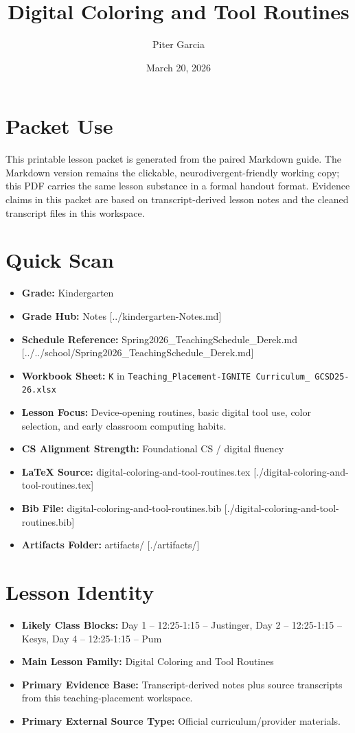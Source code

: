 \documentclass[11pt]{article}
\title{Digital Coloring and Tool Routines}
\author{Piter Garcia}
\date{March 20, 2026}
\begin{document}
\maketitle
\section*{Packet Use}
This printable lesson packet is generated from the paired Markdown guide. The Markdown version remains the clickable, neurodivergent-friendly working copy; this PDF carries the same lesson substance in a formal handout format. Evidence claims in this packet are based on transcript-derived lesson notes and the cleaned transcript files in this workspace.

\section*{Quick Scan}
\begin{itemize}[leftmargin=*]
\item \textbf{Grade:} Kindergarten
\item \textbf{Grade Hub:} Notes [../kindergarten-Notes.md]
\item \textbf{Schedule Reference:} Spring2026\_TeachingSchedule\_Derek.md [../../school/Spring2026\_TeachingSchedule\_Derek.md]
\item \textbf{Workbook Sheet:} \texttt{K} in \texttt{Teaching\_Placement-IGNITE Curriculum\_ GCSD25-26.xlsx}
\item \textbf{Lesson Focus:} Device-opening routines, basic digital tool use, color selection, and early classroom computing habits.
\item \textbf{CS Alignment Strength:} Foundational CS / digital fluency
\item \textbf{LaTeX Source:} digital-coloring-and-tool-routines.tex [./digital-coloring-and-tool-routines.tex]
\item \textbf{Bib File:} digital-coloring-and-tool-routines.bib [./digital-coloring-and-tool-routines.bib]
\item \textbf{Artifacts Folder:} artifacts/ [./artifacts/]
\end{itemize}

\section*{Lesson Identity}
\begin{itemize}[leftmargin=*]
\item \textbf{Likely Class Blocks:} Day 1 -- 12:25-1:15 -- Justinger, Day 2 -- 12:25-1:15 -- Kesys, Day 4 -- 12:25-1:15 -- Pum
\item \textbf{Main Lesson Family:} Digital Coloring and Tool Routines
\item \textbf{Primary Evidence Base:} Transcript-derived notes plus source transcripts from this teaching-placement workspace.
\item \textbf{Primary External Source Type:} Official curriculum/provider materials.
\end{itemize}
\end{document}
